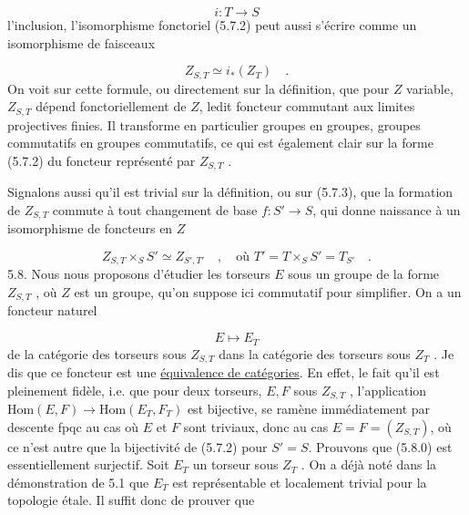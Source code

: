 
\begin{equation*}
 i : T \longrightarrow S
\end{equation*}
l'inclusion, l'isomorphisme fonctoriel (5.7.2) peut aussi s'écrire comme un isomorphisme de faisceaux

\begin{equation}\tag{5.7.3}
Z_{S,T} \simeq i_*(Z_T) \quad .
\end{equation}
On voit sur cette formule, ou directement sur la définition, que pour $Z$ variable, $Z_{S,T}$ dépend fonctoriellement de $Z$, ledit foncteur commutant aux limites projectives finies. Il transforme en particulier groupes en groupes, groupes commutatifs en groupes commutatifs, ce qui est également clair sur la forme (5.7.2) du foncteur représenté par $Z_{S,T}$ .

Signalons aussi qu'il est trivial sur la définition, ou sur (5.7.3), que la formation de $Z_{S,T}$ commute à tout changement de base $f : S' \longrightarrow S$, qui donne naissance à un isomorphisme de foncteurs en $Z$

\begin{equation}\tag{5.7.4}
Z_{S,T} \times_S S' \simeq Z_{S',T'} \quad , \quad \text{où } T' = T \times_S S' = T_{S'} \quad .
\end{equation}
5.8. Nous nous proposons d'étudier les torseurs $E$ sous un groupe de la forme $Z_{S,T}$ , où $Z$ est un groupe, qu'on suppose ici commutatif pour simplifier. On a un foncteur naturel

\begin{equation}\tag{5.8.0}
E \longmapsto E_T
\end{equation}
de la catégorie des torseurs sous $Z_{S,T}$ dans la catégorie des torseurs sous $Z_T$ . Je dis que ce foncteur est une \underline{équivalence de catégories}. En effet, le fait qu'il est pleinement fidèle, i.e. que pour deux torseurs, $E,F$ sous $Z_{S,T}$ , l'application $\mathrm{Hom}(E,F) \longrightarrow \mathrm{Hom}(E_T,F_T)$ est bijective, se ramène immédiatement par descente fpqc au cas où $E$ et $F$
sont triviaux, donc au cas $E = F = (Z_{S,T})$, où ce n'est autre que la bijectivité de (5.7.2) pour $S'=S$. Prouvons que (5.8.0) est essentiellement surjectif. Soit $E_T$ un torseur sous $Z_T$ . On a déjà noté dans la démonstration de 5.1 que $E_T$ est représentable et localement trivial pour la topologie étale. Il suffit donc de prouver que

